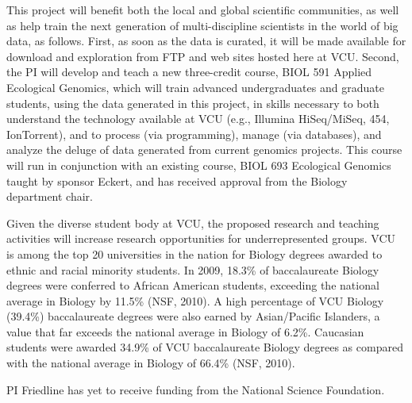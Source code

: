 This project will benefit both the local and global scientific communities, as well as help train 
the next generation of multi-discipline scientists in the world of big data, as follows.  First, as soon as the data is curated, it will be made 
available for download and exploration from FTP and web sites hosted here at VCU.  Second, the PI will develop and teach a new 
three-credit course, BIOL 591 Applied Ecological Genomics, which will train advanced undergraduates and 
graduate students, using the data generated in this project, in skills necessary to both understand the 
technology available at VCU (e.g., Illumina HiSeq/MiSeq, 454, IonTorrent), and to 
process (via programming), manage (via databases), and analyze the deluge of data generated from current genomics 
projects.  This course will run in conjunction with an existing course, BIOL 693 Ecological Genomics taught by sponsor Eckert, 
and has received approval from the Biology department chair.

Given the diverse student body at VCU, the proposed research and 
teaching activities will increase research opportunities for underrepresented groups. VCU is among the top 20 universities in the 
nation for Biology degrees awarded to ethnic and racial minority students. In 2009, 18.3\% of baccalaureate Biology degrees were 
conferred to African American students, exceeding the national average in Biology by 11.5\% (NSF, 2010). A high percentage of 
VCU Biology (39.4\%) baccalaureate degrees were also earned by Asian/Pacific Islanders, a value that far exceeds the 
national average in Biology of 6.2\%. Caucasian students were awarded 34.9\% of VCU baccalaureate Biology degrees as 
compared with the national average in Biology of 66.4\% (NSF, 2010).




PI Friedline has yet to receive funding from the National Science Foundation.
